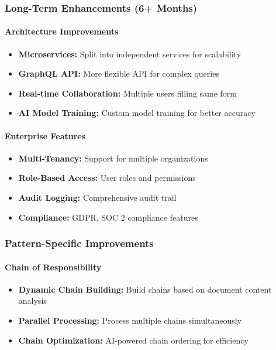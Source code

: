 \documentclass[11pt, a4paper]{article}
\theoremstyle{plain}
\theoremstyle{definition}
\begin{document}
\subsubsection{Long-Term Enhancements (6+ Months)}

\paragraph{Architecture Improvements}
\begin{itemize}
    \item \textbf{Microservices:} Split into independent services for scalability
    \item \textbf{GraphQL API:} More flexible API for complex queries
    \item \textbf{Real-time Collaboration:} Multiple users filling same form
    \item \textbf{AI Model Training:} Custom model training for better accuracy
\end{itemize}

\paragraph{Enterprise Features}
\begin{itemize}
    \item \textbf{Multi-Tenancy:} Support for multiple organizations
    \item \textbf{Role-Based Access:} User roles and permissions
    \item \textbf{Audit Logging:} Comprehensive audit trail
    \item \textbf{Compliance:} GDPR, SOC 2 compliance features
\end{itemize}

\subsubsection{Pattern-Specific Improvements}

\paragraph{Chain of Responsibility}
\begin{itemize}
    \item \textbf{Dynamic Chain Building:} Build chains based on document content analysis
    \item \textbf{Parallel Processing:} Process multiple chains simultaneously
    \item \textbf{Chain Optimization:} AI-powered chain ordering for efficiency
\end{itemize}
\end{document}
